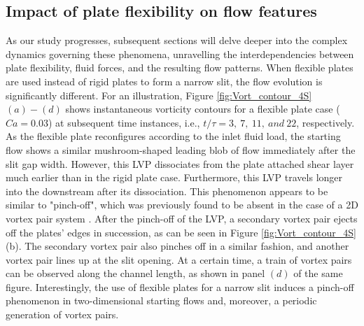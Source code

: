 \documentclass[final,3p,times,authoryear]{elsarticle}
\begin{document}
\subsection{Impact of plate flexibility on flow features}
As our study progresses, subsequent sections will delve deeper into the complex dynamics governing these phenomena, unravelling the interdependencies between plate flexibility, fluid forces, and the resulting flow patterns. When flexible plates are used instead of rigid plates to form a narrow slit, the flow evolution is significantly different. For an illustration, Figure \ref{fig:Vort_contour_4S}$(a)-(d)$ shows instantaneous vorticity contours for a flexible plate case ($Ca=0.03$) at subsequent time instances, i.e., $t/\tau=3,\ 7,\ 11,\ and \ 22$, respectively. As the flexible plate reconfigures according to the inlet fluid load, the starting flow shows a similar mushroom-shaped leading blob of flow immediately after the slit gap width. However, this LVP dissociates from the plate attached shear layer much earlier than in the rigid plate case. Furthermore, this LVP travels longer into the downstream after its dissociation. This phenomenon appears to be similar to "pinch-off", which was previously found to be absent in the case of a 2D vortex pair system \cite{pedrizzetti_2010, Afanasyev2006}. After the pinch-off of the LVP, a secondary vortex pair ejects off the plates' edges in succession, as can be seen in Figure \ref{fig:Vort_contour_4S}(b). The secondary vortex pair also pinches off in a similar fashion, and another vortex pair lines up at the slit opening. At a certain time, a train of vortex pairs can be observed along the channel length, as shown in panel $(d)$ of the same figure. Interestingly, the use of flexible plates for a narrow slit induces a pinch-off phenomenon in two-dimensional starting flows and, moreover, a periodic generation of vortex pairs.
\end{document}
